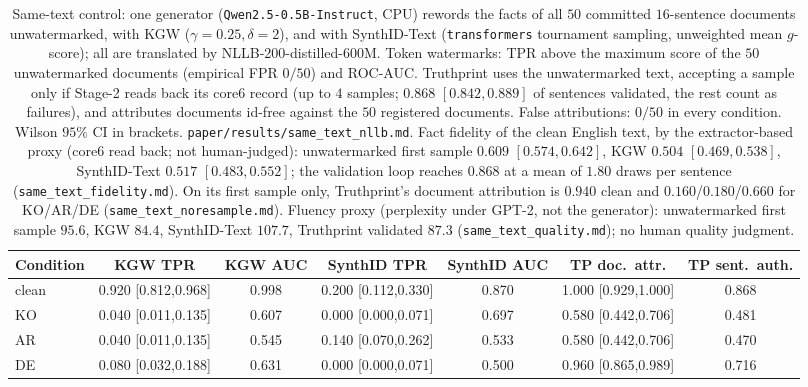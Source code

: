 \documentclass[11pt]{article}
\begin{document}
\begin{table}[t]
\centering
\caption{Same-text control: one generator (\texttt{Qwen2.5-0.5B-Instruct}, CPU)
rewords the facts of all $50$ committed $16$-sentence documents unwatermarked, with
KGW ($\gamma{=}0.25,\delta{=}2$), and with SynthID-Text (\texttt{transformers}
tournament sampling, unweighted mean $g$-score); all are translated by
NLLB-200-distilled-600M. Token watermarks: TPR above the maximum score of the
$50$ unwatermarked documents (empirical FPR $0/50$) and ROC-AUC. Truthprint uses
the unwatermarked text, accepting a sample only if Stage-2 reads back its core6
record (up to $4$ samples; $0.868$ $[0.842,0.889]$ of sentences validated, the
rest count as failures), and attributes documents id-free against the $50$
registered documents. False attributions: $0/50$ in every condition. Wilson
$95\%$ CI in brackets. \texttt{paper/results/same\_text\_nllb.md}. Fact fidelity of the clean
English text, by the extractor-based proxy (core6 read back; not human-judged):
unwatermarked first sample $0.609$ $[0.574,0.642]$, KGW $0.504$ $[0.469,0.538]$,
SynthID-Text $0.517$ $[0.483,0.552]$; the validation loop reaches $0.868$ at a
mean of $1.80$ draws per sentence (\texttt{same\_text\_fidelity.md}). On its first sample only, Truthprint's document attribution is $0.940$ clean and $0.160$/$0.180$/$0.660$ for KO/AR/DE (\texttt{same\_text\_noresample.md}). Fluency proxy (perplexity under GPT-2, not the generator): unwatermarked first sample $95.6$, KGW $84.4$, SynthID-Text $107.7$, Truthprint validated $87.3$ (\texttt{same\_text\_quality.md}); no human quality judgment.}
\label{tab:sametext}
\scriptsize
\setlength{\tabcolsep}{3pt}
\begin{tabular}{lcccccc}
\toprule
Condition & KGW TPR & KGW AUC & SynthID TPR & SynthID AUC & TP doc.\ attr. & TP sent.\ auth. \\
\midrule
clean & 0.920 [0.812,0.968] & 0.998 & 0.200 [0.112,0.330] & 0.870 & 1.000 [0.929,1.000] & 0.868 \\
KO & 0.040 [0.011,0.135] & 0.607 & 0.000 [0.000,0.071] & 0.697 & 0.580 [0.442,0.706] & 0.481 \\
AR & 0.040 [0.011,0.135] & 0.545 & 0.140 [0.070,0.262] & 0.533 & 0.580 [0.442,0.706] & 0.470 \\
DE & 0.080 [0.032,0.188] & 0.631 & 0.000 [0.000,0.071] & 0.500 & 0.960 [0.865,0.989] & 0.716 \\
\bottomrule
\end{tabular}
\end{table}
\end{document}
